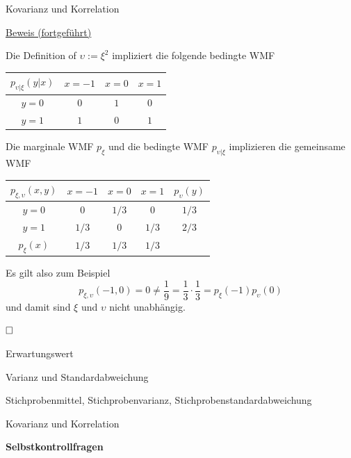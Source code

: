 \documentclass[
  8pt,
  ignorenonframetext,
]{beamer}
\newcommand{\ups}{\upsilon}
\begin{document}
\begin{frame}{Kovarianz und Korrelation}
\protect\hypertarget{kovarianz-und-korrelation-8}{}
\footnotesize

\underline{Beweis (fortgeführt)} \vspace{1mm}

Die Definition of \(\ups := \xi^2\) impliziert die folgende bedingte WMF

\center
\renewcommand{\arraystretch}{1}
\begin{tabular}{c|ccc}
$p_{\ups|\xi}(y|x)$ &   $x = -1$    &   $x = 0$     &   $x = 1$ \\\hline
$y = 0$         &   $0$         &   $1$         &   $0$     \\
$y = 1$         &   $1$         &   $0$         &   $1$     \\
\end{tabular}
\vspace{1mm}

\flushleft

Die marginale WMF \(p_\xi\) und die bedingte WMF \(p_{\ups|\xi}\)
implizieren die gemeinsame WMF

\center
\renewcommand{\arraystretch}{1.1}
\begin{tabular}{c|ccc|c}
$p_{\xi,\ups}(x,y)$ &   $x = -1$    &   $x = 0$     &   $x = 1$ & $p_\ups(y)$       \\\hline
$y = 0$         &   $0$         &   $1/3$       &   $0$     & $1/3$         \\
$y = 1$         &   $1/3$       &   $0$         &   $1/3$   & $2/3$         \\\hline
$p_\xi(x)$      &   $1/3$       &   $1/3$       &   $1/3$
\end{tabular}
\vspace{1mm}

\flushleft

Es gilt also zum Beispiel \begin{equation}
p_{\xi,\ups}(-1,0) = 0 \neq \frac{1}{9} = \frac{1}{3} \cdot \frac{1}{3} = p_{\xi}(-1)p_{\ups}( 0)
\end{equation} und damit sind \(\xi\) und \(\ups\) nicht unabhängig.

\(\hfill\Box\)
\end{frame}

\begin{frame}{}
\protect\hypertarget{section-10}{}
\large
\vfill

Erwartungswert

Varianz und Standardabweichung

Stichprobenmittel, Stichprobenvarianz, Stichprobenstandardabweichung

Kovarianz und Korrelation

\textbf{Selbstkontrollfragen} \vfill
\end{frame}
\end{document}
